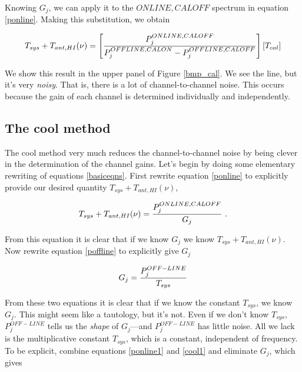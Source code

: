 \documentclass[preprint]{aastex}
\begin{document}
\noindent Knowing $G_j$, we can apply it to the $ONLINE,CALOFF$ spectrum
in equation \ref{ponline}. Making this substitution, we obtain

\begin{equation} \label{naive3}
T_{sys} + T_{ant, HI}(\nu) = \left[ {P_j^{ONLINE, CALOFF} \over 
P_j^{OFFLINE,CALON} - P_j^{OFFLINE,CALOFF}} \right] \left[ T_{cal} \right]
\end{equation}

\noindent We show this result in the upper panel of Figure \ref{bmp_cal}.
We see the line, but it's very {\it noisy}. That is, there is a lot of
channel-to-channel noise. This occurs because the gain of each channel
is determined individually and independently. 

\subsection{The cool method}

	The cool method very much reduces the channel-to-channel noise
by being clever in the determination of the channel gains. Let's begin
by doing some elementary rewriting of equations \ref{basiceqns}. First
rewrite equation \ref{ponline} to explicitly provide our desired quantity
$T_{sys} + T_{ant,HI}(\nu)$,

\begin{mathletters}

\begin{equation} \label{ponline1}
T_{sys} + T_{ant, HI}(\nu) = {P_j^{ONLINE, CALOFF} \over G_j}   \ .
\end{equation}

\noindent From this equation it is clear that if we know $G_j$ we know
$T_{sys} + T_{ant, HI}(\nu)$. Now rewrite equation \ref{poffline} to
explicitly give $G_j$

\begin{equation} \label{cool1}
G_j = {P_j^{OFF-LINE} \over T_{sys} }
\end{equation}

\end{mathletters}

\noindent From these two equations it is clear that if we know the
constant $T_{sys}$, we know $G_j$. This might seem like a tautology, but
it's not. Even if we don't know $T_{sys}$, $P_j^{OFF-LINE}$ tells us the
{\it shape} of $G_j$---and $P_j^{OFF-LINE}$ has little noise. All we
lack is the multiplicative constant $T_{sys}$, which is a constant,
independent of frequency. To be explicit, combine equations
\ref{ponline1} and \ref{cool1} and eliminate $G_j$, which gives
\end{document}
